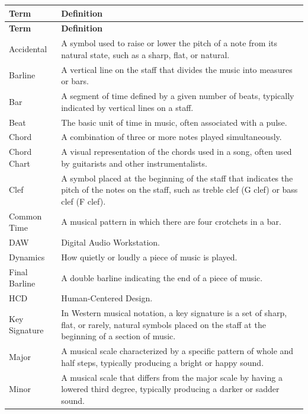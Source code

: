 \documentclass[12pt]{article}
\begin{document}
\begin{longtable}{|l|p{12cm}|}
\hline
\textbf{Term} & \textbf{Definition} \\ 
\hline
\endfirsthead

\hline
\textbf{Term} & \textbf{Definition} \\ 
\hline
\endhead

\endfoot

\endlastfoot

Accidental & A symbol used to raise or lower the pitch of a note from its natural state, such as a sharp, flat, or natural. \\ 
\hline
Barline & A vertical line on the staff that divides the music into measures or bars. \\ 
\hline
Bar & A segment of time defined by a given number of beats, typically indicated by vertical lines on a staff. \\ 
\hline
Beat & The basic unit of time in music, often associated with a pulse. \\ 
\hline
Chord & A combination of three or more notes played simultaneously. \\ 
\hline
Chord Chart & A visual representation of the chords used in a song, often used by guitarists and other instrumentalists. \\ 
\hline
Clef & A symbol placed at the beginning of the staff that indicates the pitch of the notes on the staff, such as treble clef (G clef) or bass clef (F clef). \\ 
\hline
Common Time & A musical pattern in which there are four crotchets in a bar. \\ 
\hline
DAW & Digital Audio Workstation. \\ 
\hline
Dynamics & How quietly or loudly a piece of music is played. \\ 
\hline
Final Barline & A double barline indicating the end of a piece of music. \\ 
\hline
HCD & Human-Centered Design. \\ 
\hline
Key Signature & In Western musical notation, a key signature is a set of sharp, flat, or rarely, natural symbols placed on the staff at the beginning of a section of music. \\ 
\hline
Major & A musical scale characterized by a specific pattern of whole and half steps, typically producing a bright or happy sound. \\ 
\hline
Minor & A musical scale that differs from the major scale by having a lowered third degree, typically producing a darker or sadder sound. \\ 

\end{longtable}
\end{document}
